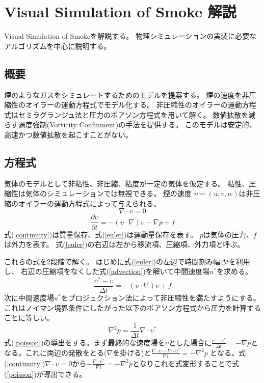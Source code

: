 \section{Visual Simulation of Smoke 解説}
\label{smoke}
Visual Simulation of Smoke\cite{Fedkiw2001}を解説する。
物理シミュレーションの実装に必要なアルゴリズムを中心に説明する。
\subsection{概要}
煙のようなガスをシミュレートするためのモデルを提案する。
煙の速度を非圧縮性のオイラーの運動方程式でモデル化する。
非圧縮性のオイラーの運動方程式はセミラグランジュ法と圧力のポアソン方程式を用いて解く。
数値拡散を減らす渦度強制(Vorticity Confinment)の手法を提供する。
このモデルは安定的、高速かつ数値拡散を起こすことがない。
\subsection{方程式}
気体のモデルとして非粘性、非圧縮、粘度が一定の気体を仮定する。
粘性、圧縮性は気体のシミュレーションでは無視できる。
煙の速度 $\upsilon = (u,v,w)$は非圧縮のオイラーの運動方程式によって与えられる。
\begin{equation}
\label{continuity}
\nabla \cdot \upsilon = 0
\end{equation}
\begin{equation}
\label{euler}
\frac{\partial \upsilon}{\partial t} = -(\upsilon \cdot \nabla)\upsilon - \nabla p + f
\end{equation}
式(\ref{continuity})は質量保存、式(\ref{euler})は運動量保存を表す。
$p$は気体の圧力、$f$は外力を表す。
式(\ref{euler})の右辺は左から移流項、圧縮項、外力項と呼ぶ。

これらの式を2段階で解く。
はじめに式(\ref{euler})の左辺で時間刻み幅$\Delta t$を利用し、
右辺の圧縮項をなくした式(\ref{advection})を解いて中間速度場$u^*$を求める。
\begin{equation}
\label{advection}
\frac{\upsilon^* - \upsilon}{\Delta t} = -(\upsilon \cdot \nabla)\upsilon + f
\end{equation}
次に中間速度場$u^*$をプロジェクション法によって非圧縮性を満たすようにする。
これはノイマン境界条件にしたがった以下のポアソン方程式から圧力を計算することに等しい。
\begin{equation}
\label{poisson}
\nabla^2 p = \frac{1}{\Delta t} \nabla \cdot \upsilon^*
\end{equation}
式(\ref{poisson})の導出をする。まず最終的な速度場を$\upsilon$とした場合に$\frac{\upsilon - \upsilon^* }{\Delta t} = - \nabla p$となる。これに両辺の発散をとる($\nabla$を掛ける)と$\frac{\nabla \cdot \upsilon - \nabla \cdot \upsilon^*}{\nabla t} = - \nabla^2 p$ となる。式(\ref{continuity})$\nabla \cdot \upsilon = 0$から$- \frac{\nabla \cdot \upsilon^*}{\nabla t} = - \nabla^2 p$となりこれを式変形することで式(\ref{poisson})が導出できる。

